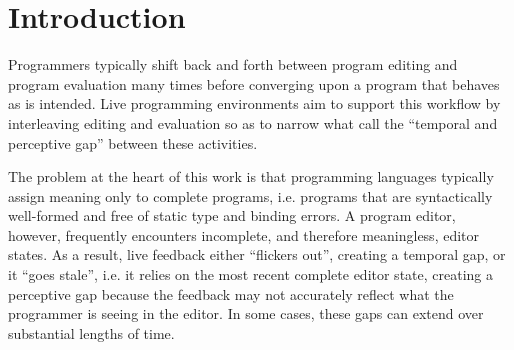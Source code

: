 
\section{Introduction}
\label{sec:intro}

Programmers typically shift back and forth between program editing and program evaluation many times before converging upon a program that behaves as is intended. 
Live programming environments aim to support this workflow by interleaving editing and evaluation so as to   
narrow what \citet{burckhardt2013s} call the ``temporal and perceptive gap'' between these activities.


%
The problem at the heart of this work is that
programming languages typically assign meaning only to {complete programs}, i.e. programs that are syntactically well-formed and free of static type and binding errors. A program editor, however, frequently encounters incomplete, and therefore meaningless, editor states. As a result, live feedback either ``flickers out'', creating a temporal gap, or it ``goes stale'', i.e. it relies on the most recent complete editor state, creating a perceptive gap because the feedback may not accurately reflect what the programmer is seeing in the editor. In some cases, these gaps can extend over substantial lengths of time.

